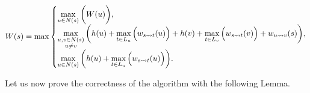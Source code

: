%


$$
W(s) = \max\left\{
   \begin{array}{@{}l@{\thinspace}l}
       \max\limits_{u \in N(s)}\bigg(W(u)\bigg), \\
       \max\limits_{\substack{u, v \in N(s) \\ u \ne v}} \bigg( h(u) + \max\limits_{t \in L_u}\Big(w_{s \rightsquigarrow t}(u)\Big) + h(v) + \max\limits_{t \in L_v}\Big(w_{s \rightsquigarrow t}(v)\Big) + w_{u \rightsquigarrow v}(s) \bigg), \\
       \max\limits_{u \in N(s)} \bigg( h(u) + \max\limits_{t \in L_u}\Big(w_{s \rightsquigarrow t}(u)\Big) \bigg). \\
   \end{array}
\right.
$$


Let us now prove the correctness of the algorithm with the following Lemma.

